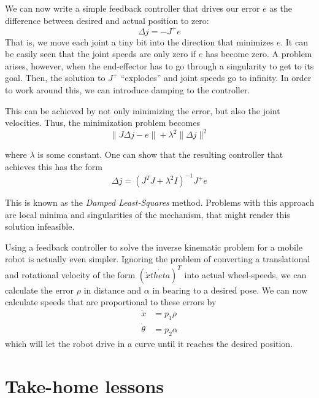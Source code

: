 We can now write a simple feedback controller that drives our error $e$ as the difference between desired and actual position to zero:
\begin{equation}
\Delta{j}=-J^+e
\end{equation}
That is, we move each joint a tiny bit into the direction that minimizes $e$.
It can be easily seen that the joint speeds are only zero if $e$ has become zero. A problem arises, however, when the end-effector has to go through a singularity to get to its goal. Then, the solution to $ J^+$ ``explodes'' and joint speeds go to infinity. In order to work around this, we can introduce damping to the controller.

This can be achieved by not only minimizing the error, but also the joint velocities. Thus, the minimization problem becomes
\begin{equation}
\|J\Delta j-e\|+\lambda^2\|\Delta j\|^2
\end{equation}

where $\lambda$ is some constant. One can show that the resulting controller that achieves this has the form
\begin{equation}
\Delta j=(J^TJ+\lambda^2 I)^{-1}J^+e
\end{equation}

This is known as the \emph{Damped Least-Squares} method. Problems with this approach are local minima and singularities of the mechanism, that might render this solution infeasible.

Using a feedback controller to solve the inverse kinematic problem for a mobile robot is actually even simpler. Ignoring the problem of converting a translational and rotational velocity of the form $(\dot{x} \dot{theta})^T$ into actual wheel-speeds, we can calculate the error $\rho$ in distance and $\alpha$ in bearing to a desired pose. We can now calculate speeds that are proportional to these errors by
\begin{eqnarray}
\dot{x} &= p_1 \rho\\
\dot{\theta} &= p_2 \alpha
\end{eqnarray}
which will let the robot drive in a curve until it reaches the desired position. 




\section*{Take-home lessons}

